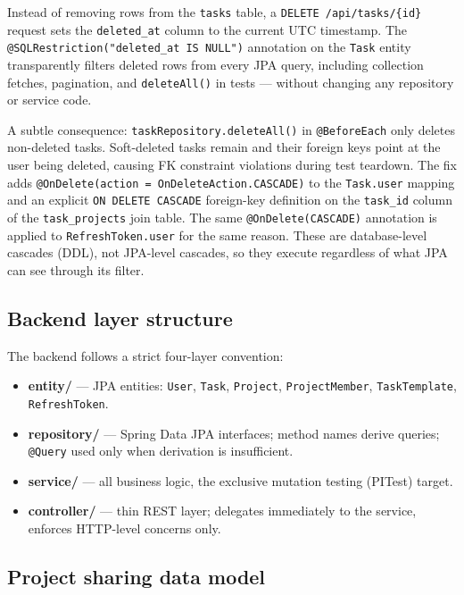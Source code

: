 \documentclass[a4paper, 12pt]{article}
\begin{document}
Instead of removing rows from the \texttt{tasks} table, a \texttt{DELETE /api/tasks/\{id\}}
request sets the \texttt{deleted\_at} column to the current UTC timestamp. The
\texttt{@SQLRestriction("deleted\_at IS NULL")} annotation on the \texttt{Task} entity
transparently filters deleted rows from every JPA query, including collection fetches,
pagination, and \texttt{deleteAll()} in tests --- without changing any repository or service
code.

A subtle consequence: \texttt{taskRepository.deleteAll()} in \texttt{@BeforeEach} only
deletes non-deleted tasks. Soft-deleted tasks remain and their foreign keys point at the user
being deleted, causing FK constraint violations during test teardown. The fix adds \texttt{@OnDelete(action = OnDeleteAction.CASCADE)} to the \texttt{Task.user}
mapping and an explicit \texttt{ON DELETE CASCADE} foreign-key definition on the
\texttt{task\_id} column of the \texttt{task\_projects} join table. The same \texttt{@OnDelete(CASCADE)} annotation is
applied to \texttt{RefreshToken.user} for the same reason. These are database-level cascades
(DDL), not JPA-level cascades, so they execute regardless of what JPA can see through its
filter.

\subsection{Backend layer structure}

The backend follows a strict four-layer convention:

\begin{itemize}
  \item \textbf{entity/} --- JPA entities: \texttt{User}, \texttt{Task}, \texttt{Project},
        \texttt{ProjectMember}, \texttt{TaskTemplate}, \texttt{RefreshToken}.
  \item \textbf{repository/} --- Spring Data JPA interfaces; method names derive queries;
        \texttt{@Query} used only when derivation is insufficient.
  \item \textbf{service/} --- all business logic, the exclusive mutation testing (PITest)
        target.
  \item \textbf{controller/} --- thin REST layer; delegates immediately to the service,
        enforces HTTP-level concerns only.
\end{itemize}

\subsection{Project sharing data model}
\end{document}

